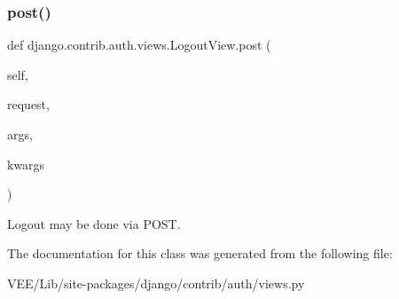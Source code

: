 \subsubsection{\texorpdfstring{post()}{post()}}
{\footnotesize\ttfamily def django.\+contrib.\+auth.\+views.\+Logout\+View.\+post (\begin{DoxyParamCaption}\item[{}]{self,  }\item[{}]{request,  }\item[{}]{args,  }\item[{}]{kwargs }\end{DoxyParamCaption})}

\begin{DoxyVerb}Logout may be done via POST.\end{DoxyVerb}
 

The documentation for this class was generated from the following file\+:\begin{DoxyCompactItemize}
\item 
V\+E\+E/\+Lib/site-\/packages/django/contrib/auth/views.\+py\end{DoxyCompactItemize}
